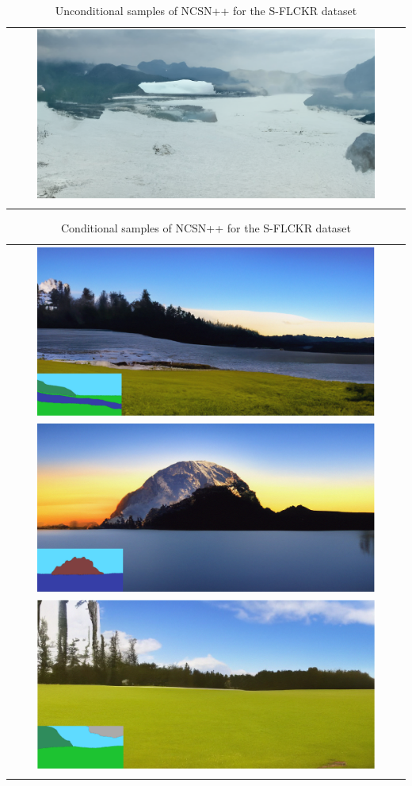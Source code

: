 \begin{longtable}{c}
    \includegraphics[width=0.87\textwidth]{Chapters/figures/appendix/flickr/9_uncond_sample.png} \\
    \caption{Unconditional samples of NCSN++ for the S-FLCKR dataset}
\end{longtable}

\begin{longtable}{c} \label{tab:a3}
    \includegraphics[width=0.87\textwidth]{Chapters/figures/experiments/flickr/flickr_sample_2.PNG} \\
    \includegraphics[width=0.87\textwidth]{Chapters/figures/experiments/flickr/flickr_sample_3.PNG} \\
    \includegraphics[width=0.87\textwidth]{Chapters/figures/experiments/flickr/flickr_sample_4.PNG} \\
    \caption{Conditional samples of NCSN++ for the S-FLCKR dataset}
\end{longtable}